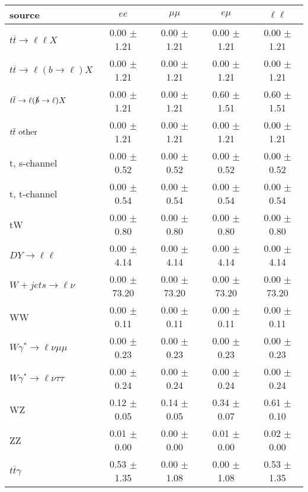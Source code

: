 \begin{tabular}{l|cccc} \hline\hline
source & $ee$ & $\mu\mu$ & $e\mu$ & $\ell\ell $ \\
\hline
$t\overline{t} \rightarrow \ell \ell X$ &  0.00 $\pm$  1.21 &  0.00 $\pm$  1.21 &  0.00 $\pm$  1.21 &  0.00 $\pm$  1.21 \\
$t\overline{t} \rightarrow \ell (b \rightarrow \ell) X$ &  0.00 $\pm$  1.21 &  0.00 $\pm$  1.21 &  0.00 $\pm$  1.21 &  0.00 $\pm$  1.21 \\
$t\overline{t} \rightarrow \ell (\slashed b \rightarrow \ell) X$ &  0.00 $\pm$  1.21 &  0.00 $\pm$  1.21 &  0.60 $\pm$  1.51 &  0.60 $\pm$  1.51 \\
        $t\overline{t}\ \rm{other}$ &  0.00 $\pm$  1.21 &  0.00 $\pm$  1.21 &  0.00 $\pm$  1.21 &  0.00 $\pm$  1.21 \\
\hline
                       t, s-channel &  0.00 $\pm$  0.52 &  0.00 $\pm$  0.52 &  0.00 $\pm$  0.52 &  0.00 $\pm$  0.52 \\
                       t, t-channel &  0.00 $\pm$  0.54 &  0.00 $\pm$  0.54 &  0.00 $\pm$  0.54 &  0.00 $\pm$  0.54 \\
                                 tW &  0.00 $\pm$  0.80 &  0.00 $\pm$  0.80 &  0.00 $\pm$  0.80 &  0.00 $\pm$  0.80 \\
\hline
         $DY \rightarrow \ell \ell$ &  0.00 $\pm$  4.14 &  0.00 $\pm$  4.14 &  0.00 $\pm$  4.14 &  0.00 $\pm$  4.14 \\
      $W+jets \rightarrow \ell \nu$ &  0.00 $\pm$ 73.20 &  0.00 $\pm$ 73.20 &  0.00 $\pm$ 73.20 &  0.00 $\pm$ 73.20 \\
                                 WW &  0.00 $\pm$  0.11 &  0.00 $\pm$  0.11 &  0.00 $\pm$  0.11 &  0.00 $\pm$  0.11 \\
\hline
$W\gamma^{*} \rightarrow \ell \nu \mu\mu$ &  0.00 $\pm$  0.23 &  0.00 $\pm$  0.23 &  0.00 $\pm$  0.23 &  0.00 $\pm$  0.23 \\
$W\gamma^{*} \rightarrow \ell \nu \tau\tau$ &  0.00 $\pm$  0.24 &  0.00 $\pm$  0.24 &  0.00 $\pm$  0.24 &  0.00 $\pm$  0.24 \\
                                 WZ &  0.12 $\pm$  0.05 &  0.14 $\pm$  0.05 &  0.34 $\pm$  0.07 &  0.61 $\pm$  0.10 \\
                                 ZZ &  0.01 $\pm$  0.00 &  0.00 $\pm$  0.00 &  0.01 $\pm$  0.00 &  0.02 $\pm$  0.00 \\
\hline
              $t\overline{t}\gamma$ &  0.53 $\pm$  1.35 &  0.00 $\pm$  1.08 &  0.00 $\pm$  1.08 &  0.53 $\pm$  1.35 \\

\end{tabular}
